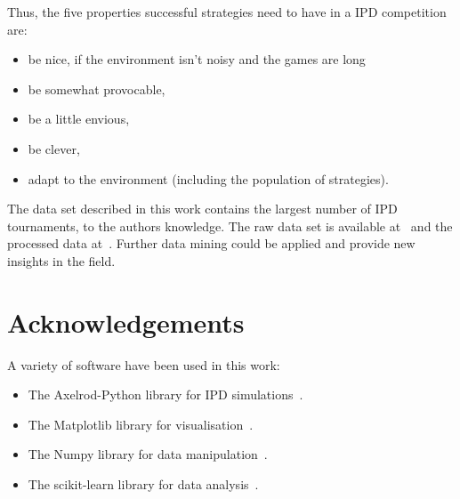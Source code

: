 \documentclass{article}
\begin{document}
Thus, the five properties successful strategies need to have in a IPD competition
are:

\begin{itemize}
\item be nice, if the environment isn't noisy and the games are long
    \item be somewhat provocable,
    \item be a little envious,
    \item be clever,
    \item adapt to the environment (including the population of strategies).
\end{itemize}

The data set described in this work contains the largest number of IPD tournaments,
to the authors knowledge. The raw data set is available at~\cite{raw_data} and the
processed data at~\cite{data}. Further data mining
could be applied and provide new insights in the field.




\section{Acknowledgements}

A variety of software have been used in this work:

\begin{itemize}
    \item The Axelrod-Python library for IPD simulations~\cite{axelrodproject}.
    \item The Matplotlib library for visualisation~\cite{hunter2007matplotlib}.
    \item The Numpy library for data manipulation~\cite{walt2011numpy}.
    \item The scikit-learn library for data analysis~\cite{scikit-learn}.
\end{itemize}

\appendix






\end{document}
